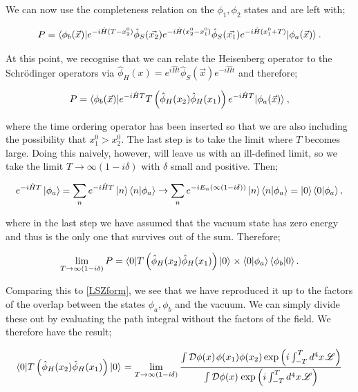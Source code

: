 We can now use the completeness relation on the $\phi_1, \phi_2$ states and are left with;

\begin{equation}
P = \mathinner{\langle\phi_b(\vec{x})\vert e^{-i \hat{H}(T - x_2^0)} \hat{\phi}_S(\vec{x_2}) e^{-i\hat{H}(x_2^0 - x_1^0)} \hat{\phi}_S(\vec{x_1}) e^{-i \hat{H}(x_1^0 + T)}\vert\phi_a(\vec{x})\rangle}_{}.
\end{equation}

At this point, we recognise that we can relate the Heisenberg operator to the Schr\"odinger operators via $\hat{\phi}_H(x) = e^{i \hat{H} t} \hat{\phi}_S(\vec{x}) e^{-i \hat{H} t}$ and therefore;

\begin{equation}
P = \mathinner{\langle\phi_b(\vec{x})\vert e^{- i \hat{H} T} T \left(\hat{\phi}_H(x_2) \hat{\phi}_H(x_1) \right) e^{-i \hat{H} T}\vert\phi_a(\vec{x})\rangle}_{},
\end{equation}

where the time ordering operator has been inserted so that we are also including the possibility that $x_1^0 > x_2^0$. The last step is to take the limit where $T$ becomes large. Doing this naively, however, will leave us with an ill-defined limit, so we take the limit $T \to \infty(1- i \delta)$ with $\delta$ small and positive. Then;

\begin{equation}
e^{-i \hat{H} T} \mathinner{\lvert\phi_a\rangle}_{\hspace{-0.1em}} = \sum_n e^{-i \hat{H} T} \mathinner{\lvert n\rangle}_{\hspace{-0.1em}} \left<n | \phi_a \right> \to \sum_n e^{-i E_n (\infty(1 - i \delta))}\mathinner{\lvert n\rangle}_{\hspace{-0.1em}} \left<n | \phi_a \right> = \mathinner{\lvert0\rangle}_{\hspace{-0.1em}} \left<0 | \phi_a \right>,
\end{equation}

where in the last step we have assumed that the vacuum state has zero energy and thus is the only one that survives out of the sum. Therefore;

\begin{equation}
\lim_{T \to \infty(1- i \delta)} P = \mathinner{\langle0\vert T \left(\hat{\phi}_H(x_2) \hat{\phi}_H(x_1) \right)\vert0\rangle}_{} \times \left<0 | \phi_a \right>\left<\phi_b | 0 \right>. 
\end{equation}

Comparing this to \ref{LSZform}, we see that we have reproduced it up to the factors of the overlap between the states $\phi_a, \phi_b$ and the vacuum. We can simply divide these out by evaluating the path integral without the factors of the field. We therefore have the result;

\begin{equation}
 \mathinner{\langle0\vert T \left(\hat{\phi}_H(x_2) \hat{\phi}_H(x_1) \right)\vert0\rangle}_{} = \lim_{T \to \infty(1 - i \delta)} \frac{\int  \mathcal{D} \phi(x) \hspace{1pt}  \phi(x_1) \phi(x_2) \exp \left( i \int_{-T}^T d^4 x \hspace{1pt} \mathscr{L} \right)}{\int  \mathcal{D} \phi(x) \hspace{1pt} \exp \left( i \int_{-T}^T d^4 x \hspace{1pt} \mathscr{L} \right)}
\end{equation}

